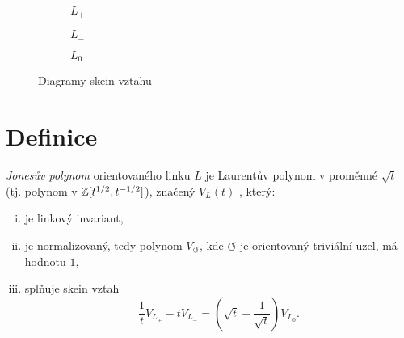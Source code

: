 \begin{figure}[h]  
\centering 
\begin{subfigure}[t]{0.4\linewidth}\centering
{} 
\caption{$L_+$} 
\end{subfigure}
\begin{subfigure}[t]{0.4\linewidth}\centering
{}  
\caption{$L_-$}
\end{subfigure}
\begin{subfigure}[t]{0.4\linewidth}\centering
{}
\caption{$L_0$}
\end{subfigure}
\caption{Diagramy skein vztahu}
\end{figure}

\section{Definice}

\begin{definice}\label{def01:1}
\emph{Jonesův polynom} orientovaného linku $L$ je Laurentův polynom v proměnné $\sqrt t$ (tj. polynom v $\mathbb{Z}[t^{1/2}, t^{-1/2}]$), značený $V_L(t)$ , který:
\begin{enumerate}[i.]
\item
je linkový invariant,
\item 
  je normalizovaný, tedy polynom  $V_\circlearrowleft$, kde $\circlearrowleft$ je orientovaný triviální uzel, má hodnotu $1,$
\item  
splňuje skein vztah 
$$ \frac{1}{t} V_{L_+} - t V_{L_-} = (\sqrt{t}  - \frac{1}{\sqrt{t}}) V_{L_0}.$$
\end{enumerate}
\end{definice}


